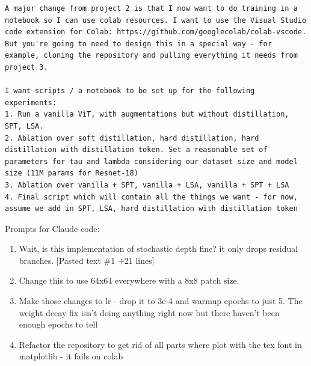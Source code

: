 \documentclass[11pt]{article}
\begin{document}
\begin{enumerate}
\begin{verbatim}
A major change from project 2 is that I now want to do training in a notebook so I can use colab resources. I want to use the Visual Studio code extension for Colab: https://github.com/googlecolab/colab-vscode. But you're going to need to design this in a special way - for example, cloning the repository and pulling everything it needs from project 3. 

I want scripts / a notebook to be set up for the following experiments:
1. Run a vanilla ViT, with augmentations but without distillation, SPT, LSA. 
2. Ablation over soft distillation, hard distillation, hard distillation with distillation token. Set a reasonable set of parameters for tau and lambda considering our dataset size and model size (11M params for Resnet-18)
3. Ablation over vanilla + SPT, vanilla + LSA, vanilla + SPT + LSA
4. Final script which will contain all the things we want - for now, assume we add in SPT, LSA, hard distillation with distillation token
\end{verbatim}


\end{enumerate}

Prompts for Claude code:
\begin{enumerate}
  \item Wait, is this implementation of stochastic depth fine? it only drops residual branches. [Pasted text \#1 +21 lines]   
  \item  Change this to use 64x64 everywhere with a 8x8 patch size.  
  \item Make those changes to lr - drop it to 3e-4 and warmup epochs to just 5. The  
  weight decay fix isn't doing anything right now but there haven't been enough  
  epochs to tell            
  \item Refactor the repository to get rid of all parts where plot with the tex font in matplotlib - it fails on colab 
\end{enumerate}





\end{document}
